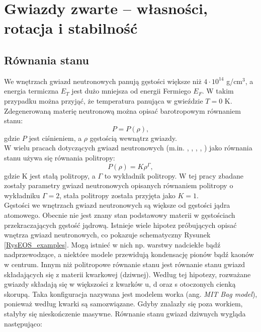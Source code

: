 \documentclass{bachelor_thesis}
\begin{document}
    \chapter{Gwiazdy zwarte -- własności, rotacja i stabilność}
        \section{Równania stanu}
        We wnętrzach gwiazd neutronowych panują gęstości większe niż $4\cdot 10^{14}$ g/cm$^3$, a energia termiczna $E_T$ jest dużo mniejsza od energii Fermiego $E_F$. W takim przypadku można przyjąć, że temperatura panująca w gwieździe $T=0$ K. Zdegenerowaną materię neutronową można opisać barotropowym równaniem stanu:
        \begin{equation}
            P=P(\rho)
            \label{EqBar},
        \end{equation}
        gdzie $P$ jest ciśnieniem, a $\rho$ gęstością wewnątrz gwiazdy. \\
        \indent W wielu pracach dotyczących gwiazd neutronowych (m.in. \citealp{Cook1992}, \citealp{Cook1994a}, \citealp{Baumgarte2000}, \citealp{Giacomazzo2011}, \citealp{Rosinska2017}) jako równania stanu używa się równania politropy:
        \begin{equation}
            P(\rho)=K\rho^{\Gamma},
            \label{EqPol}
        \end{equation}
        gdzie K jest stałą politropy, a $\Gamma$ to wykładnik politropy. W tej pracy zbadane zostały parametry gwiazd neutronowych opisanych równaniem politropy o wykładniku $\Gamma=2$, stała politropy została przyjęta jako $K=1$.\\
        \indent Gęstości we wnętrzach gwiazd neutronowych są większe od gęstości jądra atomowego. Obecnie nie jest znany stan podstawowy materii w gęstościach przekraczających gęstość jądrową. Istnieje wiele hipotez próbujących opisać wnętrza gwiazd neutronowych, co pokazuje schematyczny Rysunek \ref{RysEOS_examples}. Mogą istnieć w nich np. warstwy nadciekłe bądź nadprzewodzące, a niektóre modele przewidują kondensację pionów bądź kaonów w centrum. Innym niż politropowe równanie stanu jest równanie stanu gwiazd składających się z materii kwarkowej (dziwnej). Według tej hipotezy, rozważane gwiazdy składają się w większości z kwarków u, d oraz s otoczonych cienką skorupą. Taka konfiguracja nazywana jest modelem worka (ang. \textit{MIT Bag model}), ponieważ według \cite{Haensel2007} kwarki są samozwiązane. Gdyby znalazły się poza workiem, stałyby się nieskończenie masywne. Równanie stanu gwiazd dziwnych wygląda następująco:
\end{document}
